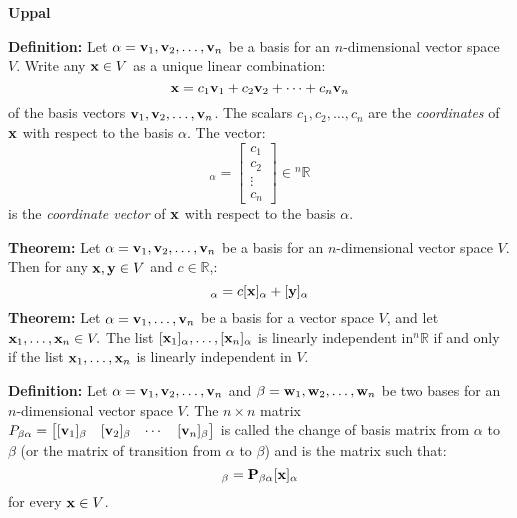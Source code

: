 \documentclass{article}
\begin{document}
    \hfill
    \begin{minipage}[t]{.45\textwidth}
        \begin{center}
            \textbf{Uppal}
        \end{center}
        \textbf{Definition:} Let $\alpha = \mathbf{v}_1, \mathbf{v}_2, \dots, \mathbf{v}_n$ be a basis for an $n$-dimensional vector space $V$. Write any $\mathbf{x} \in V$ as a unique linear combination:
        \begin{equation*}
            \mathbf{x}=c_1\mathbf{v}_1 + c_2\mathbf{v}_2 + \cdots + c_n\mathbf{v}_n
        \end{equation*}
        of the basis vectors $\mathbf{v}_1, \mathbf{v}_2, \dots, \mathbf{v}_n$. The scalars $c_1,c_2,\dots,c_n$ are the \textit{coordinates} of $\mathbf{x}$ with respect to the basis $\alpha$. The vector:
        \begin{equation*}
            [\bff{x}]_\alpha = \begin{bmatrix}
                c_1\\c_2\\ \vdots \\ c_n
            \end{bmatrix} \in {^n}\mathbb{R}
        \end{equation*}
        is the \textit{coordinate vector} of $\mathbf{x}$ with respect to the basis $\alpha$.
        \vspace{2mm}

        \textbf{Theorem:} Let $\alpha=\mathbf{v}_1,\mathbf{v}_2,\dots,\mathbf{v}_n$ be a basis for an $n$-dimensional vector space $V$. Then for any $\mathbf{x},\mathbf{y} \in V$ and $c \in \mathbb{R}$,:
        \begin{equation*}
            [c\bff{x}+\bff{y}]_\alpha = c[\bff{x}]_\alpha + [\bff{y}]_\alpha
        \end{equation*}
        \textbf{Theorem:} Let $\alpha=\mathbf{v}_1,\dots,\mathbf{v}_n$ be a basis for a vector space $V$, and let $\mathbf{x}_1,\dots,\mathbf{x}_n \in V.$ The list $[\mathbf{x}_1]_\alpha, \dots, [\mathbf{x}_n]_\alpha$ is linearly independent in${^n}\mathbb{R}$ if and only if the list $\mathbf{x}_1, \dots, \mathbf{x}_n$ is linearly independent in $V$.
        \vspace{2mm}

        \textbf{Definition:} Let $\alpha=\mathbf{v}_1,\mathbf{v}_2,\dots,\mathbf{v}_n$ and $\beta=\mathbf{w}_1,\mathbf{w}_2,\dots,\mathbf{w}_n$ be two bases for an $n$-dimensional vector space $V$. The $n\times n$ matrix $P_{\beta\alpha} = \begin{bmatrix}
            [\mathbf{v}_1]_\beta & [\mathbf{v}_2]_\beta & \cdots & [\mathbf{v}_n]_\beta
        \end{bmatrix}$ is called the change of basis matrix from $\alpha$ to $\beta$ (or the matrix of transition from $\alpha$ to $\beta$) and is the matrix such that:
        \begin{equation*}
            [\bff{x}]_\beta = \bff{P}_{\beta\alpha}[\bff{x}]_\alpha
        \end{equation*}
        for every $\mathbf{x} \in V$.
        \vspace{2mm}


\end{minipage}
\end{document}
